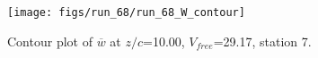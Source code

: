 \begin{figure}[H]
\centering
\texttt{[image: figs/run\_68/run\_68\_W\_contour]}
\caption{Contour plot of $\overline{w}$ at $z/c$=10.00, $V_{free}$=29.17, station 7.}
\label{fig:run_68_W_contour}
\end{figure}


